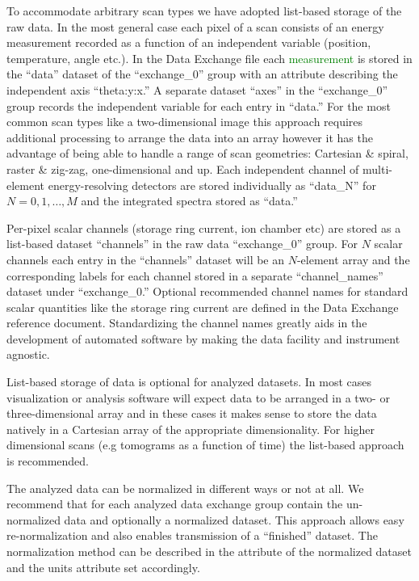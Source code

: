 \documentclass[pdf]{iucr}              %
\begin{document}
To accommodate arbitrary scan types we have adopted list-based storage of the raw data. In the most general case each pixel of a scan consists of an energy measurement recorded as a function of an independent variable (position, temperature, angle etc.). In the Data Exchange file each \textcolor{green}{measurement} is stored in the ``data'' dataset of the ``exchange\_0'' group with an attribute describing the independent axis ``theta:y:x.'' A separate dataset ``axes'' in the ``exchange\_0'' group records the independent variable for each entry in ``data.'' For the most common scan types like a two-dimensional image this approach requires additional processing to arrange the data into an array however it has the advantage of being able to handle a range of scan geometries: Cartesian \& spiral, raster \& zig-zag, one-dimensional and up. Each independent channel of multi-element energy-resolving detectors are stored individually as ``data\_N'' for $N=0,1,\ldots,M$ and the integrated spectra stored as ``data.''

Per-pixel scalar channels (storage ring current, ion chamber etc) are stored as a list-based dataset ``channels'' in the raw data ``exchange\_0'' group. For $N$ scalar channels each entry in the ``channels'' dataset will be an $N$-element array and the corresponding labels for each channel stored in a separate ``channel\_names'' dataset under ``exchange\_0.'' Optional recommended channel names for standard scalar quantities like the storage ring current are defined in the Data Exchange reference document. Standardizing the channel names greatly aids in the development of automated software by making the data facility and instrument agnostic. 

List-based storage of data is optional for analyzed datasets. In most cases visualization or analysis software will expect data to be arranged in a two- or three-dimensional array and in these cases it makes sense to store the data natively in a Cartesian array of the appropriate dimensionality. For higher dimensional scans (e.g tomograms as a function of time) the list-based approach is recommended.

The analyzed data can be normalized in different ways or not at all. We recommend that for each analyzed data exchange group contain the un-normalized data and optionally a normalized dataset. This approach allows easy re-normalization and also enables transmission of a ``finished'' dataset. The normalization method can be described in the attribute of the normalized dataset and the units attribute set accordingly.
\end{document}
